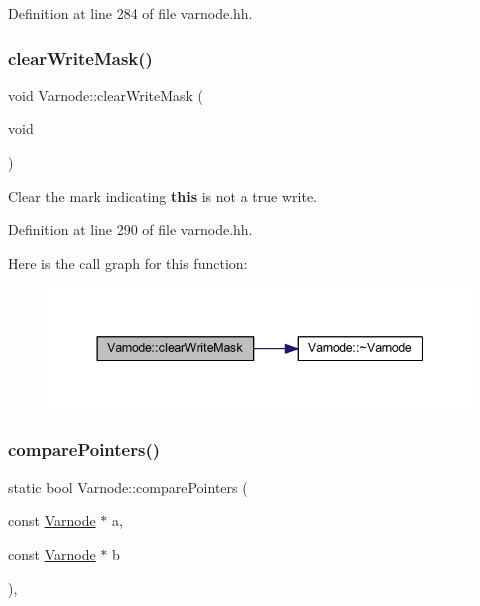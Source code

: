 Definition at line 284 of file varnode.\+hh.

\mbox{\label{class_varnode_a115e29fabb2032903e93166339f19184}} 
\subsubsection{\texorpdfstring{clearWriteMask()}{clearWriteMask()}}
{\footnotesize\ttfamily void Varnode\+::clear\+Write\+Mask (\begin{DoxyParamCaption}\item[{void}]{ }\end{DoxyParamCaption})\hspace{0.3cm}{\ttfamily [inline]}}



Clear the mark indicating {\bfseries{this}} is not a true write. 



Definition at line 290 of file varnode.\+hh.

Here is the call graph for this function\+:
\nopagebreak
\begin{figure}[H]
\begin{center}
\leavevmode
\includegraphics[width=344pt]{class_varnode_a115e29fabb2032903e93166339f19184_cgraph}
\end{center}
\end{figure}
\mbox{\label{class_varnode_a5739fd0f16b4321090f1108a4c618229}} 
\subsubsection{\texorpdfstring{comparePointers()}{comparePointers()}}
{\footnotesize\ttfamily static bool Varnode\+::compare\+Pointers (\begin{DoxyParamCaption}\item[{const \mbox{\hyperlink{class_varnode}{Varnode}} $\ast$}]{a,  }\item[{const \mbox{\hyperlink{class_varnode}{Varnode}} $\ast$}]{b }\end{DoxyParamCaption})\hspace{0.3cm}{\ttfamily [inline]}, {\ttfamily [static]}}



